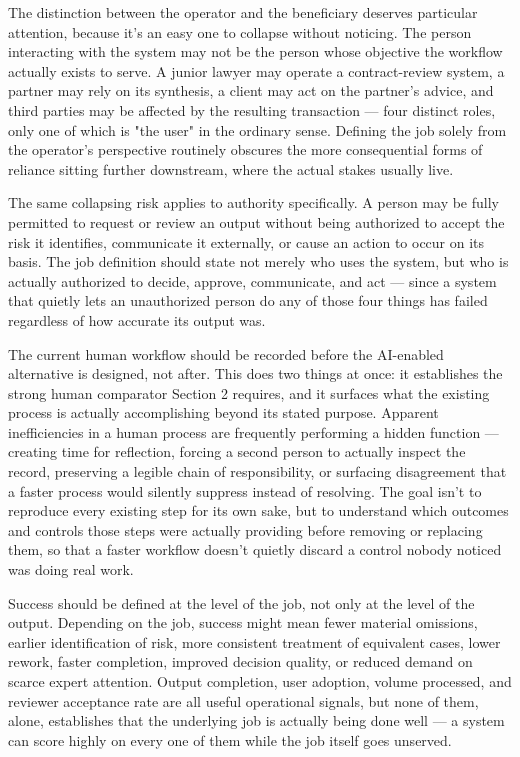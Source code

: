 The distinction between the operator and the beneficiary deserves particular attention, because it's an easy one to collapse without noticing. The person interacting with the system may not be the person whose objective the workflow actually exists to serve. A junior lawyer may operate a contract-review system, a partner may rely on its synthesis, a client may act on the partner's advice, and third parties may be affected by the resulting transaction --- four distinct roles, only one of which is "the user" in the ordinary sense. Defining the job solely from the operator's perspective routinely obscures the more consequential forms of reliance sitting further downstream, where the actual stakes usually live.

The same collapsing risk applies to authority specifically. A person may be fully permitted to request or review an output without being authorized to accept the risk it identifies, communicate it externally, or cause an action to occur on its basis. The job definition should state not merely who uses the system, but who is actually authorized to decide, approve, communicate, and act --- since a system that quietly lets an unauthorized person do any of those four things has failed regardless of how accurate its output was.

The current human workflow should be recorded before the AI-enabled alternative is designed, not after. This does two things at once: it establishes the strong human comparator Section 2 requires, and it surfaces what the existing process is actually accomplishing beyond its stated purpose. Apparent inefficiencies in a human process are frequently performing a hidden function --- creating time for reflection, forcing a second person to actually inspect the record, preserving a legible chain of responsibility, or surfacing disagreement that a faster process would silently suppress instead of resolving. The goal isn't to reproduce every existing step for its own sake, but to understand which outcomes and controls those steps were actually providing before removing or replacing them, so that a faster workflow doesn't quietly discard a control nobody noticed was doing real work.

Success should be defined at the level of the job, not only at the level of the output. Depending on the job, success might mean fewer material omissions, earlier identification of risk, more consistent treatment of equivalent cases, lower rework, faster completion, improved decision quality, or reduced demand on scarce expert attention. Output completion, user adoption, volume processed, and reviewer acceptance rate are all useful operational signals, but none of them, alone, establishes that the underlying job is actually being done well --- a system can score highly on every one of them while the job itself goes unserved.

